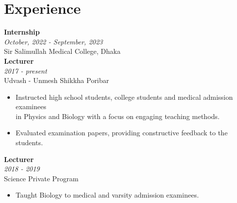 \documentclass[a4paper,12pt]{article}
\newcommand{\resumeentry}[2]{
    \textbf{#1} \\
    \textit{#2}
}
\begin{document}
\begin{minipage}[t][6cm]{0.98\textwidth}
\section*{Experience}
\resumeentry{Internship}{October, 2022 - September, 2023}\\ Sir Salimullah Medical College, Dhaka \vspace{0.2cm} \\
\resumeentry{Lecturer}{2017 - present}\\ Udvash - Unmesh Shikkha Poribar
\begin{itemize}[left=0em, itemsep=0pt, parsep=0pt]
  \item Instructed high school students, college students and medical admission examinees \\
  in Physics and Biology with a focus on engaging teaching methods.
  \item Evaluated examination papers, providing constructive feedback to the students.
\end{itemize}
\resumeentry{Lecturer}{2018 - 2019}\\ Science Private Program
\begin{itemize}[left=0em, itemsep=0pt, parsep=-10pt]
  \item Taught Biology to medical and varsity admission examinees.
\end{itemize}
\end{minipage}
\end{document}
